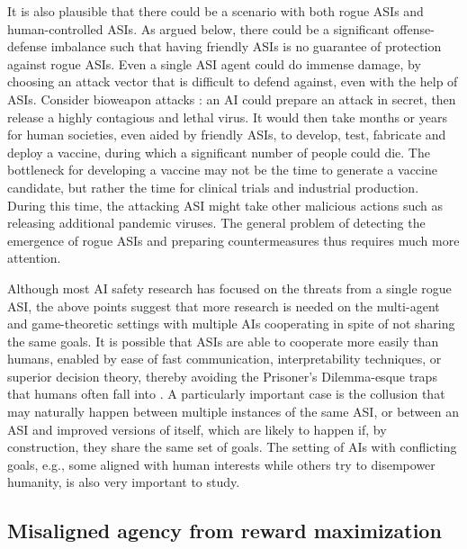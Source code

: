 It is also plausible that there could be a scenario with both rogue ASIs and human-controlled ASIs.
As argued below, there could be a significant offense-defense imbalance such that having friendly ASIs is no guarantee of protection against rogue ASIs. Even a single ASI agent could do immense damage, by choosing an attack vector that is difficult to defend against, even with the help of ASIs. Consider bioweapon attacks \cite{www.nti.org.analysis.articles.the.convergence.of.artificial.intelligence.and.the.life.sciences}: an AI could prepare an attack in secret, then release a highly contagious and lethal virus. It would then take months or years for human societies, even aided by friendly ASIs, to develop, test, fabricate and deploy a vaccine, during which a significant number of people could die. The bottleneck for developing a vaccine may not be the time to generate a vaccine candidate, but rather the time for clinical trials and industrial production. During this time, the attacking ASI might take other malicious actions such as releasing additional pandemic viruses. The general problem of detecting the emergence of rogue ASIs and preparing countermeasures thus requires much more attention.

Although most AI safety research has focused on the threats from a single rogue ASI, the above points suggest that more research is needed on the multi-agent and game-theoretic settings with multiple AIs cooperating \cite{arxiv.org.abs.2012.08630} in spite of not sharing the same goals. It is possible that ASIs are able to cooperate more easily than humans, enabled by ease of fast communication, interpretability techniques, or superior decision theory, thereby avoiding the Prisoner’s Dilemma-esque traps that humans often fall into \cite{arxiv.org.abs.2409.02822}. A particularly important case is the collusion that may naturally happen between multiple instances of the same ASI, or between an ASI and improved versions of itself, which are likely to happen if, by construction, they share the same set of goals. The setting of AIs with conflicting goals, e.g., some aligned with human interests while others try to disempower humanity, is also very important to study.    

\subsection{Misaligned agency from reward maximization}
\label{sec:existential:misagencyreward}

